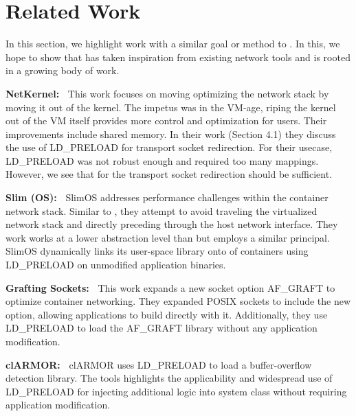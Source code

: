 \section{Related Work}
In this section, we highlight work with a similar goal or method to \sysname.
In this, we hope to show that \sysname has taken inspiration from existing network tools and is rooted in a growing body of work.

\textbf{NetKernel:~\cite{netkernel}}
This work focuses on moving optimizing the network stack by moving it out of the kernel.
The impetus was in the VM-age, riping the kernel out of the VM itself provides more control and optimization for users.
Their improvements include shared memory.
In their work (Section 4.1) they discuss the use of LD\_PRELOAD for transport socket redirection.
For their usecase, LD\_PRELOAD was not robust enough and required too many mappings.
However, we see that for \sysname the transport socket redirection should be sufficient.


\textbf{Slim (OS):~\cite{slimos}}
SlimOS addresses performance challenges within the container network stack.
Similar to \sysname, they attempt to avoid traveling the virtualized network stack and directly preceding through the host network interface.
They work works at a lower abstraction level than \sysname but employs a similar principal.
SlimOS dynamically links its user-space library onto of containers using LD\_PRELOAD on unmodified application binaries.


\textbf{Grafting Sockets:~\cite{graft}}
This work expands a new socket option AF\_GRAFT to optimize container networking.
They expanded POSIX sockets to include the new option, allowing applications to build directly with it.
Additionally, they use LD\_PRELOAD to load the AF\_GRAFT library without any application modification.


\textbf{clARMOR:~\cite{clarmor}}
clARMOR uses LD\_PRELOAD to load a buffer-overflow detection library.
The tools highlights the applicability and widespread use of LD\_PRELOAD for injecting additional logic into system class without requiring application modification.